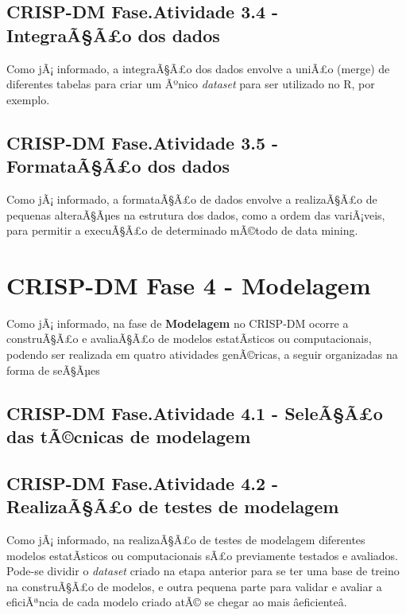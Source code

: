 \documentclass[]{article}
\begin{document}
\subsection{CRISP-DM Fase.Atividade 3.4 - IntegraÃ§Ã£o dos
dados}\label{crisp-dm-fase.atividade-3.4---integraaao-dos-dados}

Como jÃ¡ informado, a integraÃ§Ã£o dos dados envolve a uniÃ£o (merge) de
diferentes tabelas para criar um Ãºnico \emph{dataset} para ser
utilizado no R, por exemplo.

\subsection{CRISP-DM Fase.Atividade 3.5 - FormataÃ§Ã£o dos
dados}\label{crisp-dm-fase.atividade-3.5---formataaao-dos-dados}

Como jÃ¡ informado, a formataÃ§Ã£o de dados envolve a realizaÃ§Ã£o de
pequenas alteraÃ§Ãµes na estrutura dos dados, como a ordem das
variÃ¡veis, para permitir a execuÃ§Ã£o de determinado mÃ©todo de data
mining.

\section{\texorpdfstring{CRISP-DM Fase 4 -
\textbf{Modelagem}}{CRISP-DM Fase 4 - Modelagem}}\label{crisp-dm-fase-4---modelagem}

Como jÃ¡ informado, na fase de \textbf{Modelagem} no CRISP-DM ocorre a
construÃ§Ã£o e avaliaÃ§Ã£o de modelos estatÃ­sticos ou computacionais,
podendo ser realizada em quatro atividades genÃ©ricas, a seguir
organizadas na forma de seÃ§Ãµes

\subsection{CRISP-DM Fase.Atividade 4.1 - SeleÃ§Ã£o das tÃ©cnicas de
modelagem}\label{crisp-dm-fase.atividade-4.1---seleaao-das-tacnicas-de-modelagem}

\subsection{CRISP-DM Fase.Atividade 4.2 - RealizaÃ§Ã£o de testes de
modelagem}\label{crisp-dm-fase.atividade-4.2---realizaaao-de-testes-de-modelagem}

Como jÃ¡ informado, na realizaÃ§Ã£o de testes de modelagem diferentes
modelos estatÃ­sticos ou computacionais sÃ£o previamente testados e
avaliados. Pode-se dividir o \emph{dataset} criado na etapa anterior
para se ter uma base de treino na construÃ§Ã£o de modelos, e outra
pequena parte para validar e avaliar a eficiÃªncia de cada modelo criado
atÃ© se chegar ao mais âeficienteâ.
\end{document}
